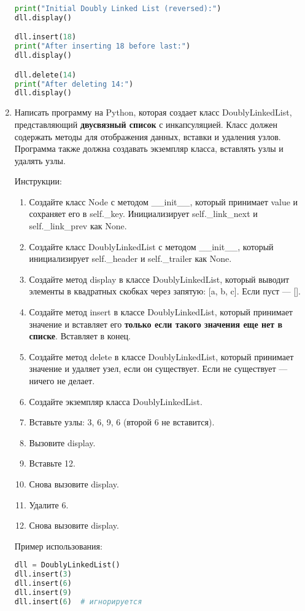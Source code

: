 \begin{enumerate}
\begin{lstlisting}[language=Python]
print("Initial Doubly Linked List (reversed):")
dll.display()

dll.insert(18)
print("After inserting 18 before last:")
dll.display()

dll.delete(14)
print("After deleting 14:")
dll.display()
\end{lstlisting}

\item Написать программу на Python, которая создает класс DoublyLinkedList, представляющий \textbf{двусвязный список} с инкапсуляцией. Класс должен содержать методы для отображения данных, вставки и удаления узлов. Программа также должна создавать экземпляр класса, вставлять узлы и удалять узлы.

Инструкции:
\begin{enumerate}
    \item Создайте класс Node с методом \_\_init\_\_, который принимает value и сохраняет его в self.\_key. Инициализирует self.\_link\_next и self.\_link\_prev как None.
    \item Создайте класс DoublyLinkedList с методом \_\_init\_\_, который инициализирует self.\_header и self.\_trailer как None.
    \item Создайте метод display в классе DoublyLinkedList, который выводит элементы в квадратных скобках через запятую: [a, b, c]. Если пуст — [].
    \item Создайте метод insert в классе DoublyLinkedList, который принимает значение и вставляет его \textbf{только если такого значения еще нет в списке}. Вставляет в конец.
    \item Создайте метод delete в классе DoublyLinkedList, который принимает значение и удаляет узел, если он существует. Если не существует — ничего не делает.
    \item Создайте экземпляр класса DoublyLinkedList.
    \item Вставьте узлы: 3, 6, 9, 6 (второй 6 не вставится).
    \item Вызовите display.
    \item Вставьте 12.
    \item Снова вызовите display.
    \item Удалите 6.
    \item Снова вызовите display.
\end{enumerate}

Пример использования:
\begin{lstlisting}[language=Python]
dll = DoublyLinkedList()
dll.insert(3)
dll.insert(6)
dll.insert(9)
dll.insert(6)  # игнорируется


\end{lstlisting}
\end{enumerate}
